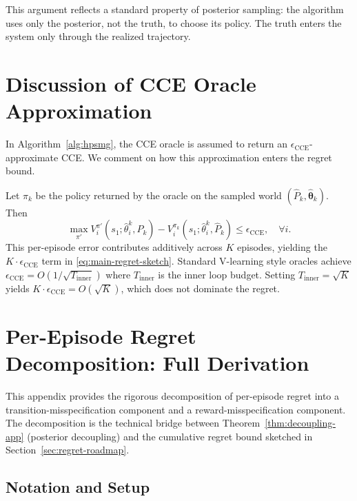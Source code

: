 This argument reflects a standard property of posterior sampling: the algorithm uses only the posterior, not the truth, to choose its policy. The truth enters the system only through the realized trajectory.

\section{Discussion of CCE Oracle Approximation}
\label{app:cce}

In Algorithm~\ref{alg:hpsmg}, the CCE oracle is assumed to return an $\epsilon_{\mathrm{CCE}}$-approximate CCE. We comment on how this approximation enters the regret bound.

Let $\pi_k$ be the policy returned by the oracle on the sampled world $(\hat{P}_k, \hat{\boldsymbol{\theta}}_k)$. Then
\begin{equation}
\max_{\pi'} V_i^{\pi'}(s_1; \hat{\theta}_i^k, \hat{P}_k) - V_i^{\pi_k}(s_1; \hat{\theta}_i^k, \hat{P}_k) \leq \epsilon_{\mathrm{CCE}}, \quad \forall i.
\end{equation}
This per-episode error contributes additively across $K$ episodes, yielding the $K \cdot \epsilon_{\mathrm{CCE}}$ term in \eqref{eq:main-regret-sketch}. Standard V-learning style oracles \citep{jin2021v} achieve $\epsilon_{\mathrm{CCE}} = O(1/\sqrt{T_{\mathrm{inner}}})$ where $T_{\mathrm{inner}}$ is the inner loop budget. Setting $T_{\mathrm{inner}} = \sqrt{K}$ yields $K \cdot \epsilon_{\mathrm{CCE}} = O(\sqrt{K})$, which does not dominate the regret.

\section{Per-Episode Regret Decomposition: Full Derivation}
\label{app:regret-decomp}

This appendix provides the rigorous decomposition of per-episode regret into a transition-misspecification component and a reward-misspecification component. The decomposition is the technical bridge between Theorem~\ref{thm:decoupling-app} (posterior decoupling) and the cumulative regret bound sketched in Section~\ref{sec:regret-roadmap}.

\subsection{Notation and Setup}

